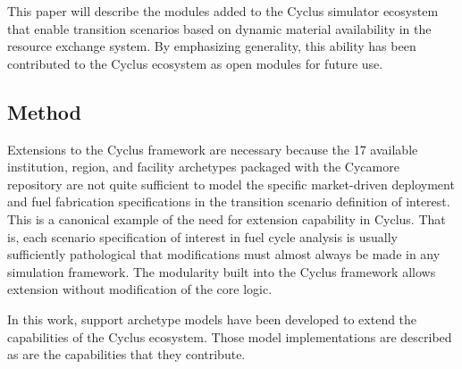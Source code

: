 
This paper will describe the modules added to the Cyclus simulator ecosystem
that enable transition scenarios based on dynamic material availability in the
resource exchange system. By emphasizing generality, this ability has been
contributed to the Cyclus ecosystem as open modules for future use. 


\subsection{Method}




Extensions to the Cyclus framework are necessary because the 17 available
institution, region, and facility archetypes packaged with the Cycamore
repository are not quite sufficient to model the specific market-driven
deployment and fuel fabrication specifications in the transition scenario
definition of interest. This is a canonical example of the need for extension
capability in Cyclus. That is, each scenario specification of interest in fuel
cycle analysis is usually sufficiently pathological that modifications must
almost always be made in any simulation framework. The modularity built into
the Cyclus framework allows extension without modification of the core logic.  

In this work, support archetype models have been developed to extend the
capabilities of the Cyclus ecosystem. Those model implementations are described
as are the capabilities that they contribute. 
